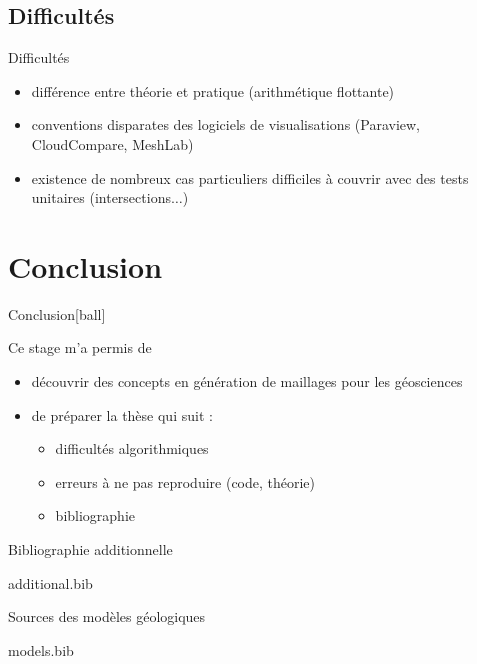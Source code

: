 \documentclass[aspectratio=169, 12pt, a4paper, hyperref={pdfauthor={Alexandre MARIN}, pdfkeywords={IFPEN, Delaunay, Voronoi, mesh generation}, colorlinks=true, linkcolor=purple, urlcolor=blue, citecolor=magenta}]{beamer}
\begin{document}
\subsection{Difficultés}

\begin{Energie}{Difficultés}
\begin{itemize}
\item différence entre théorie et pratique (arithmétique flottante)
\item conventions disparates des logiciels de visualisations (Paraview, CloudCompare, MeshLab)
\item existence de nombreux cas particuliers difficiles à couvrir avec des tests unitaires (intersections$\dots$)
\end{itemize}
\end{Energie}

\section{Conclusion}
\begin{Energie}{Conclusion}[ball]

Ce stage m'a permis de

\begin{itemize}
\item<1-> découvrir des concepts en génération de maillages pour les géosciences
\item<2-> de préparer la thèse qui suit : 
\begin{itemize}
\item<3-> difficultés algorithmiques
\item<4-> erreurs à ne pas reproduire (code, théorie)
\item<5-> bibliographie
\end{itemize}
\end{itemize}
\end{Energie}

\makeByeSlide

\begin{Energie}{\small Bibliographie additionnelle}

{\tiny
\begin{btSect}{additional.bib}
\btPrintNotCited
\end{btSect}}
\end{Energie}

\begin{Energie}{\small Sources des modèles géologiques}

{\fontsize{10}{12}\selectfont
\begin{btSect}{models.bib}
\btPrintNotCited
\btPrintCited
\end{btSect}}
\end{Energie}
\end{document}

